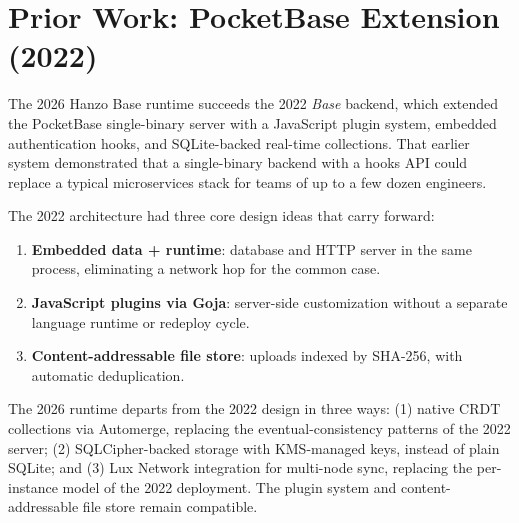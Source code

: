 \section{Prior Work: PocketBase Extension (2022)}
\label{sec:prior-pocketbase}

The 2026 Hanzo Base runtime succeeds the 2022 \emph{Base} backend, which extended the PocketBase single-binary server with a JavaScript plugin system, embedded authentication hooks, and SQLite-backed real-time collections. That earlier system demonstrated that a single-binary backend with a hooks API could replace a typical microservices stack for teams of up to a few dozen engineers.

The 2022 architecture had three core design ideas that carry forward:
\begin{enumerate}
    \item \textbf{Embedded data + runtime}: database and HTTP server in the same process, eliminating a network hop for the common case.
    \item \textbf{JavaScript plugins via Goja}: server-side customization without a separate language runtime or redeploy cycle.
    \item \textbf{Content-addressable file store}: uploads indexed by SHA-256, with automatic deduplication.
\end{enumerate}

The 2026 runtime departs from the 2022 design in three ways: (1) native CRDT collections via Automerge, replacing the eventual-consistency patterns of the 2022 server; (2) SQLCipher-backed storage with KMS-managed keys, instead of plain SQLite; and (3) Lux Network integration for multi-node sync, replacing the per-instance model of the 2022 deployment. The plugin system and content-addressable file store remain compatible.
